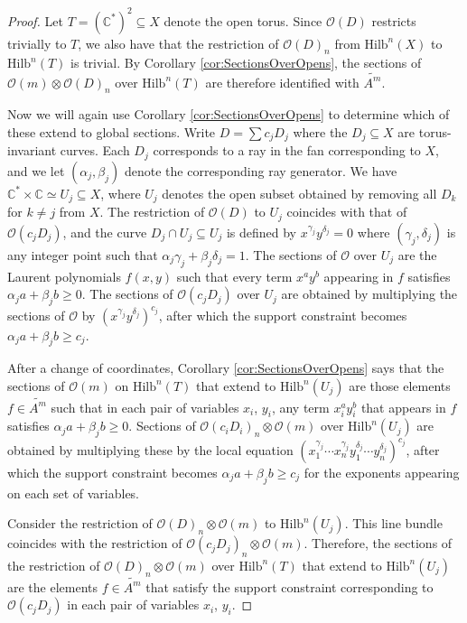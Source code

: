\documentclass[12pt]{amsart}
\newcommand{\Hilb}{\mathrm{Hilb}}
\newcommand{\C}{\mathbb{C}}
\numberwithin{equation}{section}
\theoremstyle{definition}
\begin{document}
\begin{proof}
    Let $T=(\C^*)^2\subseteq X$ denote the open torus. Since $\mathcal{O}(D)$ restricts trivially to $T$, we also have that the restriction of $\mathcal{O}(D)_n$ from $\Hilb^n(X)$ to $\Hilb^n(T)$ is trivial. By Corollary \ref{cor:SectionsOverOpens}, the sections of $\mathcal{O}(m)\otimes \mathcal{O}(D)_n$ over $\Hilb^n(T)$ are therefore identified with $\widetilde{A^m}$. 

    Now we will again use Corollary \ref{cor:SectionsOverOpens} to determine which of these extend to global sections. Write $D = \sum c_j D_j$ where the $D_j\subseteq X$ are torus-invariant curves. Each $D_j$ corresponds to a ray in the fan corresponding to $X$, and we let $(\alpha_j,\beta_j)$ denote the corresponding ray generator. We have $\C^*\times \C\simeq U_j\subseteq X$, where $U_j$ denotes the open subset obtained by removing all $D_k$ for $k\neq j$ from $X$. The restriction of $\mathcal{O}(D)$ to $U_j$ coincides with that of $\mathcal{O}(c_jD_j)$, and the curve $D_j\cap U_j\subseteq U_j$ is defined by $x^{\gamma_j}y^{\delta_j}=0$ where $(\gamma_j,\delta_j)$ is any integer point such that $\alpha_j \gamma_j +\beta_j\delta_j=1$. The sections of $\mathcal{O}$ over $U_j$ are the Laurent polynomials $f(x,y)$ such that every term $x^ay^b$ appearing in $f$ satisfies $\alpha_j a+\beta_j b \geq 0$. The sections of $\mathcal{O}(c_jD_j)$ over $U_j$ are obtained by multiplying the sections of $\mathcal{O}$ by $(x^{\gamma_j}y^{\delta_j})^{c_j}$, after which the support constraint becomes $\alpha_j a+\beta_j b \geq c_j$.

    After a change of coordinates, Corollary \ref{cor:SectionsOverOpens} says that the sections of $ \mathcal{O}(m)$ on $\Hilb^n(T)$ that extend to $\Hilb^n(U_j)$ are those elements $f\in \widetilde{A^m}$ such that in each pair of variables $x_i$, $y_i$, any term $x_i^a y_i^b$ that appears in $f$ satisfies $\alpha_j a+\beta_j b\geq 0$. Sections of $\mathcal{O}(c_iD_i)_n\otimes \mathcal{O}(m)$ over $\Hilb^n(U_j)$ are obtained by multiplying these by the local equation $(x_1^{\gamma_j}\cdots x_n^{\gamma_j}y_1^{\delta_j}\cdots y_n^{\delta_j})^{c_j}$, after which the support constraint becomes $\alpha_j a+\beta_j b \geq c_j$ for the exponents appearing on each set of variables.

    Consider the restriction of $\mathcal{O}(D)_n\otimes \mathcal{O}(m)$ to $\Hilb^n(U_j)$. This line bundle coincides with the restriction of $\mathcal{O}(c_jD_j)_n\otimes \mathcal{O}(m)$. Therefore, the sections of the restriction of $\mathcal{O}(D)_n\otimes \mathcal{O}(m)$ over $\Hilb^n(T)$ that extend to $\Hilb^n(U_j)$ are the elements $f\in \widetilde{A^m}$ that satisfy the support constraint corresponding to $\mathcal{O}(c_jD_j)$ in each pair of variables $x_i$, $y_i$.


\end{proof}
\end{document}
